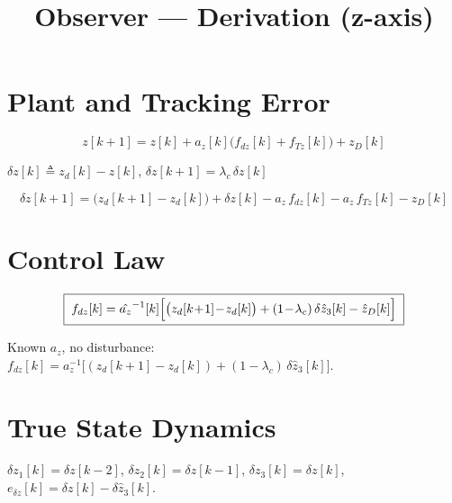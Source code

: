 \documentclass[11pt,a4paper]{article}
\title{Observer --- Derivation (z-axis)}
\author{}\date{}
\newcommand{\dz}{\delta z}
\newcommand{\dzhat}[1]{\delta\hat{z}_{#1}}
\newcommand{\edz}{e_{\delta z}}
\newcommand{\fdz}{f_{dz}}
\newcommand{\fTz}{f_{Tz}}
\newcommand{\az}{a_z}
\newcommand{\lc}{\lambda_c}
\begin{document}
\maketitle
\vspace{-1.5em}

\section{Plant and Tracking Error}

\begin{equation}
  z[k\!+\!1] = z[k]
    + \az[k]\bigl(\fdz[k] + \fTz[k]\bigr)
    + z_D[k]
  \label{eq:plant}
\end{equation}

$\dz[k]\triangleq z_d[k]-z[k]$,\quad
$\dz[k\!+\!1]=\lc\,\dz[k]$

\begin{equation}
  \dz[k\!+\!1]
  = \bigl(z_d[k\!+\!1]\!-\!z_d[k]\bigr)
    + \dz[k] - \az\,\fdz[k] - \az\,\fTz[k] - z_D[k]
  \label{eq:error-dyn}
\end{equation}

\section{Control Law}

\begin{equation}
  \boxed{\;
    \fdz[k] = \hat{\az}^{-1}[k]\Bigl[
      \bigl(z_d[k\!+\!1]\!-\!z_d[k]\bigr)
      + (1\!-\!\lc)\,\dzhat{3}[k]
      - \hat{z}_D[k]\Bigr]
  \;}
  \label{eq:control}
\end{equation}

Known $\az$, no disturbance:\;
$\fdz[k] = \az^{-1}\bigl[
  (z_d[k\!+\!1]\!-\!z_d[k]) + (1\!-\!\lc)\,\dzhat{3}[k]\bigr]$.

\section{True State Dynamics}

$\dz_1[k]\!=\!\dz[k\!-\!2]$,\;
$\dz_2[k]\!=\!\dz[k\!-\!1]$,\;
$\dz_3[k]\!=\!\dz[k]$,\;
$\edz[k]\!=\!\dz[k]\!-\!\dzhat{3}[k]$.
\end{document}
